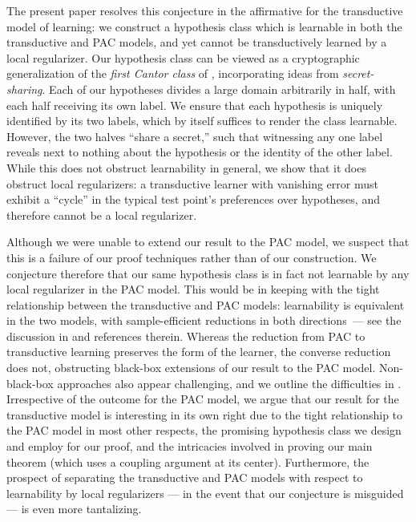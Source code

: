 The present paper resolves this conjecture in the affirmative for the transductive model of learning: we construct a hypothesis class which is learnable in both the transductive and PAC models, and yet cannot be transductively learned by a local regularizer. Our hypothesis class can be viewed as a cryptographic generalization of the \emph{first Cantor class} of \cite{DS14}, incorporating ideas from \emph{secret-sharing}. Each of our hypotheses divides a large domain arbitrarily in half, with each half receiving its own label. We ensure that each hypothesis is uniquely identified by its two labels, which by itself suffices to render the class learnable. However, the two halves ``share a secret,'' such that witnessing any one label reveals next to nothing about the hypothesis or the identity of the other label. While this does not obstruct learnability in general, we show that it does obstruct local regularizers: a transductive learner with vanishing error must exhibit a ``cycle'' in the typical test point's preferences over hypotheses, and therefore cannot be a local regularizer.

Although we were unable to extend our result to the PAC model, we suspect that this is a failure of our proof techniques rather than of our construction. We conjecture therefore that our same hypothesis class is in fact not learnable by any local regularizer in the PAC model. This would be in keeping with the tight relationship between the transductive and PAC models: learnability is equivalent in the two models, with sample-efficient reductions in both directions~--- see the discussion in \citep{trans_equiv_pac?,shaddin_position} and references therein. Whereas the reduction from PAC to transductive learning preserves the form of the learner, the converse reduction does not, obstructing black-box extensions of our result to the PAC model. Non-black-box approaches also appear challenging, and we outline the difficulties in . Irrespective of the outcome for the PAC model, we argue that our result for the transductive model is interesting in its own right due to the tight relationship to the PAC model in most other respects, the promising hypothesis class we design and employ for our proof, and the intricacies involved in proving our main theorem (which uses a coupling argument at its center). Furthermore, the prospect of separating the transductive and PAC models with respect to learnability by local regularizers --- in the event that our conjecture is misguided --- is even more tantalizing. 
